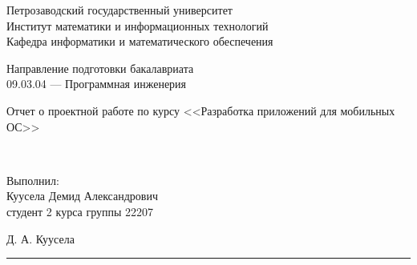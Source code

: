 \documentclass[a4paper,12pt]{article}
\newcommand{\myrule}[1]{\rule{#1}{0.4pt}}
\newcommand{\sign}[2][~]{{\small\myrule{#2}\\[-0.7em]\makebox[#2]{\it #1}}}
\renewcommand{\baselinestretch}{1.50}
\begin{document}

\thispagestyle{empty}
\begin{center}


    \renewcommand{\baselinestretch}{1}
    {\large
        {\sc Петрозаводский государственный университет\\
            Институт математики и информационных технологий\\
            Кафедра информатики и математического обеспечения
        }
    }

\end{center}


\begin{center}
    Направление подготовки бакалавриата \\
    09.03.04 --- Программная инженерия \\
\end{center}

\vfill

\begin{center}
    {\normalsize
    Отчет о проектной работе по курсу <<Разработка приложений для мобильных ОС>>}

    \medskip

    {\Large {}} \\
\end{center}

\medskip

\begin{flushright}
    \parbox{11cm}{%
        \renewcommand{\baselinestretch}{1.2}
        \normalsize
        Выполнил:\\
        Куусела Демид Александрович\\
        студент 2 курса группы 22207
        \begin{flushright}
            Д. А. Куусела \sign[подпись]{4cm}
        \end{flushright}


    }
\end{flushright}
\end{document}
